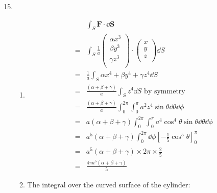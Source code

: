 \documentclass[10pt,\jkfside,a4paper]{article}
\begin{document}
\begin{enumerate}
\setcounter{enumi}{14}

\item
\begin{enumerate}

\item
\[
\begin{split}
 & \int_S \mathbf{F}\cdot \dd{\mathbf{S}} \\
=& \int_S \frac{1}{a} \begin{pmatrix} \alpha x^3 \\ \beta y^3 \\ \gamma z^3 \\ \end{pmatrix} \cdot \begin{pmatrix} x \\ y \\ z \\ \end{pmatrix}\dd{S} \\
=& \frac{1}{a}\int_S \alpha x^4 + \beta y^4 + \gamma z^4 \dd{S} \\
=& \frac{(\alpha + \beta + \gamma)}{a} \int_S z^4 \dd{S} \text{ by symmetry}\\
=& \frac{(\alpha + \beta + \gamma)}{a} \int^{2\pi}_0\int^\pi_0 a^2 z^4\sin\theta \dd{\theta}\dd{\phi} \\
=& a(\alpha + \beta + \gamma) \int^{2\pi}_0\int^\pi_0 a^4 \cos^4 \theta \sin\theta \dd{\theta}\dd{\phi} \\
=& a^5(\alpha + \beta + \gamma) \int^{2\pi}_0\dd{\phi}\left[-\frac{1}{5}\cos^5\theta\right]^\pi_0 \\
=& a^5(\alpha + \beta + \gamma) \times 2\pi \times \frac{2}{5} \\
=& \frac{4\pi a^5 (\alpha + \beta + \gamma)}{5}
\end{split}
\]

\item 

The integral over the curved surface of the cylinder:


\end{enumerate}
\end{enumerate}
\end{document}
